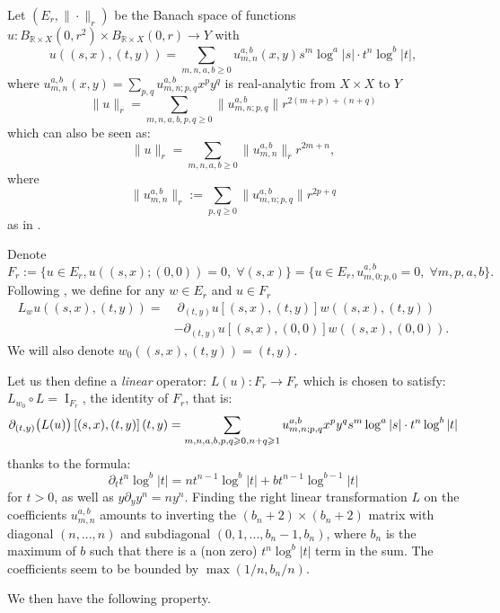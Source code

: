 \documentclass[12pt]{article}
\begin{document}
    Let $(E_r,\|\cdot\|_r)$ be the Banach space of functions $u: B_{\mathbb{R}\times X}(0,r^2)\times B_{\mathbb{R}\times X}(0,r)\to Y$ with 
    $$ u\left((s,x),(t,y)\right) = \sum_{m,n,a,b\geqslant 0} u_{m,n}^{a,b}(x,y)s^m\log^a|s|\cdot t^n\log^b|t|, $$
    where $u_{m,n}^{a,b}(x,y) = \sum_{p,q} u_{m,n;p,q}^{a,b}x^py^q$ is real-analytic from $X\times X$ to $Y$
    $$\|u\|_r = \sum_{m,n,a,b,p,q\geqslant 0} \|u_{m,n;p,q}^{a,b}\|r^{2(m+p)+(n+q)}$$
    which can also be seen as:
    $$\|u\|_r = \sum_{m,n,a,b\geqslant 0} \|u_{m,n}^{a,b}\|_r r^{2m+n},$$
    where $$\|u_{m,n}^{a,b}\|_r:= \sum_{p,q\geqslant 0}\|u_{m,n;p,q}^{a,b}\|r^{2p+q}$$
    as in \cite{bt}.
    
    Denote $$F_r:=\{u\in E_r, u((s,x);(0,0))=0,\; \forall (s,x)\} =  \{u\in E_r, u_{m,0;p,0}^{a,b}=0, \; \forall m,p,a,b\}.$$ 
    Following \cite{bt}, we define for any $w\in E_r$ and $u\in F_r$
    \begin{align*}
        L_wu((s,x),(t,y)) =&\; \partial_{(t,y)} u\left[(s,x),(t,y)\right] w ((s,x),(t,y)) \\
        &-\partial_{(t,y)}u\left[(s,x),(0,0)\right] w ((s,x),(0,0)).
    \end{align*}
    We will also denote $w_0((s,x),(t,y)) = (t,y)$.
    
    Let us then define a \emph{linear} operator:
    $L(u): F_r\to F_r$
    which is chosen to satisfy: $ L_{w_0} \circ L = \operatorname{I}_{F_r}$, the identity of $F_r$, that is:
    \begin{equation}
        \partial_{(t,y)} \big(L(u)\big)\left[(s,x),(t,y)\right](t,y) = \sum_{m,n,a,b,p,q\geqslant 0,\\ n+q\geqslant1} u_{m,n;p,q}^{a,b} x^py^qs^m\log^a|s|\cdot
             t^n\log^b|t|\label{prop Lu}
    \end{equation}
    thanks to the formula:
    $$ \partial_{t} t^n\log^b|t| = nt^{n-1}\log^{b}|t| + bt^{n-1}\log^{b-1}|t|$$
    for $t>0$, as well as $ y\partial_yy^n = n y^n$. Finding the right linear transformation $L$ on the coefficients $u_{m,n}^{a,b}$ amounts to inverting the $(b_n+2)\times (b_n+2)$ matrix with diagonal $(n,...,n)$ and subdiagonal $(0,1,...,b_n-1,b_n)$, where $b_n$ is the maximum of $b$ such that there is a (non zero) $t^n\log^b|t|$ term in the sum. The coefficients seem to be bounded by $\max(1/n,b_n/n)$.
    
    
    We then have the following property.
    
\end{document}
